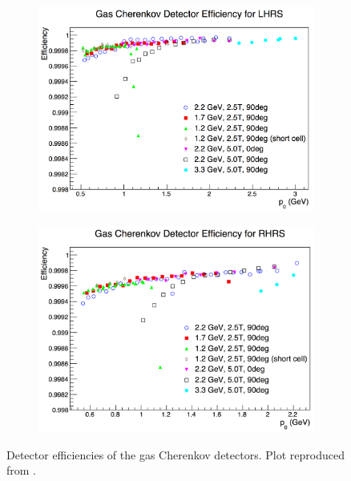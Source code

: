 \begin{figure}[tb!]
  \centering
  \begin{subfigure}[t]{0.49\textwidth}
    \includegraphics[width=\textwidth]{figs/Cherenkov-efficiency-left.png}
  \end{subfigure}
  \begin{subfigure}[t]{0.49\textwidth}
    \includegraphics[width=\textwidth]{figs/Cherenkov-efficiency-right.png}
  \end{subfigure}
  \caption[Detector efficiencies of the gas Cherenkov detectors.]{Detector efficiencies of the gas Cherenkov detectors. Plot reproduced from \cite{Cummings2013}. \label{C7S2SS2F1}}
\end{figure}

